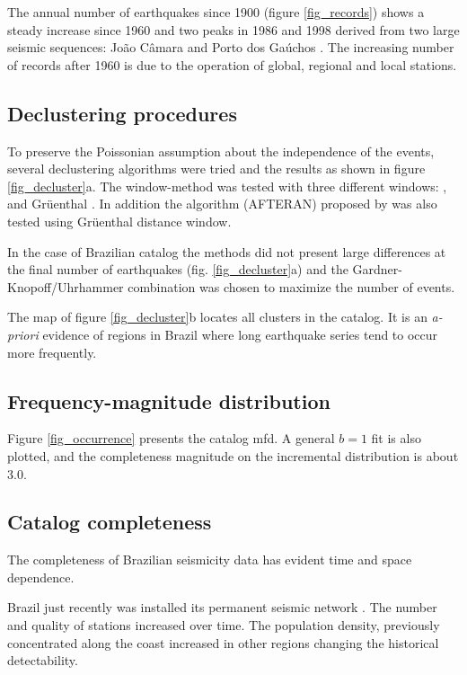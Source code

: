 \documentclass[grl]{agutex}
\begin{document}
\begin{article}
The annual number of earthquakes since 1900 (figure \ref{fig_records}) shows a steady increase since 1960 and two peaks in 1986 and 1998 derived from two large seismic sequences: João Câmara \citep{takeya_1989} and Porto dos Gaúchos \citep{barros_2009}. The increasing number of records after 1960 is due to the operation of global, regional and local stations.



\subsection{Declustering procedures}

To preserve the Poissonian assumption about the independence of the events, several declustering algorithms were tried and the results as shown in figure \ref{fig_decluster}a. The window-method \citep{gardner_1974} was tested with three different windows: \citet{gardner_1974}, \citet{uhrhammer_1986} and Gr\"uenthal \citep{van_stiphout_2012}.
In addition the algorithm (AFTERAN) proposed by \citet{musson_1999} was also tested using Gr\"uenthal distance window.

In the case of Brazilian catalog the methods did not present large differences at the final number of earthquakes (fig. \ref{fig_decluster}a) and the Gardner-Knopoff/Uhrhammer combination was chosen to maximize the number of events.

The map of figure \ref{fig_decluster}b locates all clusters in the catalog. It is an \emph{a-priori} evidence of regions in Brazil where long earthquake series tend to occur more frequently.



\subsection{Frequency-magnitude distribution}

Figure \ref{fig_occurrence} presents the catalog \gls{mfd}.
A general $b=1$ fit is also plotted, and the completeness magnitude on the incremental distribution is about 3.0.


\subsection{Catalog completeness}

The completeness of Brazilian seismicity data has evident time and space dependence.

Brazil just recently was installed its permanent seismic network \citep{pirchiner_2011}. The number and quality of stations increased over time. The population density, previously concentrated along the coast increased in other regions changing the historical detectability.


\end{article}
\end{document}
